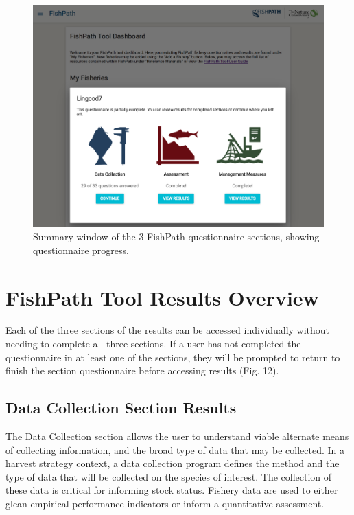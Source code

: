\documentclass[11pt,]{book}
\begin{document}
\begin{figure}
 
 {\centering \includegraphics[width=0.95\linewidth]{images/summary-screen} 
 
 }
 
 \caption{Summary window of the 3 FishPath questionnaire sections, showing questionnaire progress.}\label{fig:summary-screen}
 \end{figure}

\hypertarget{fishpath-tool-results-overview}{%
\chapter{FishPath Tool Results
Overview}\label{fishpath-tool-results-overview}}

Each of the three sections of the results can be accessed individually
without needing to complete all three sections. If a user has not
completed the questionnaire in at least one of the sections, they will
be prompted to return to finish the section questionnaire before
accessing results (Fig. 12).

\hypertarget{data-collection-section-results}{%
\section{Data Collection Section
Results}\label{data-collection-section-results}}

The Data Collection section allows the user to understand viable
alternate means of collecting information, and the broad type of data
that may be collected. In a harvest strategy context, a data collection
program defines the method and the type of data that will be collected
on the species of interest. The collection of these data is critical for
informing stock status. Fishery data are used to either glean empirical
performance indicators or inform a quantitative assessment.
\end{document}

